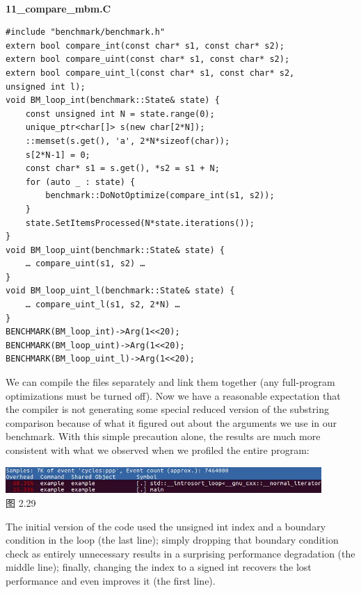 \hspace*{\fill} \\ %
\noindent
\textbf{11\_compare\_mbm.C}
\begin{lstlisting}[style=styleCXX]
#include "benchmark/benchmark.h"
extern bool compare_int(const char* s1, const char* s2);
extern bool compare_uint(const char* s1, const char* s2);
extern bool compare_uint_l(const char* s1, const char* s2,
unsigned int l);
void BM_loop_int(benchmark::State& state) {
	const unsigned int N = state.range(0);
	unique_ptr<char[]> s(new char[2*N]);
	::memset(s.get(), 'a', 2*N*sizeof(char));
	s[2*N-1] = 0;
	const char* s1 = s.get(), *s2 = s1 + N;
	for (auto _ : state) {
		benchmark::DoNotOptimize(compare_int(s1, s2));
	}
	state.SetItemsProcessed(N*state.iterations());
}
void BM_loop_uint(benchmark::State& state) {
	… compare_uint(s1, s2) …
}
void BM_loop_uint_l(benchmark::State& state) {
	… compare_uint_l(s1, s2, 2*N) …
}
BENCHMARK(BM_loop_int)->Arg(1<<20);
BENCHMARK(BM_loop_uint)->Arg(1<<20);
BENCHMARK(BM_loop_uint_l)->Arg(1<<20);
\end{lstlisting}

We can compile the files separately and link them together (any full-program optimizations must be turned off). Now we have a reasonable expectation that the compiler is not generating some special reduced version of the substring comparison because of what it figured out about the arguments we use in our benchmark. With this simple precaution alone, the results are much more consistent with what we observed when we profiled the entire program:

\begin{center}
\includegraphics[width=0.9\textwidth]{content/1/chapter2/images/29.jpg}\\
图 2.29
\end{center}

The initial version of the code used the unsigned int index and a boundary condition in the loop (the last line); simply dropping that boundary condition check as entirely unnecessary results in a surprising performance degradation (the middle line); finally, changing the index to a signed int recovers the lost performance and even improves it (the first line).

